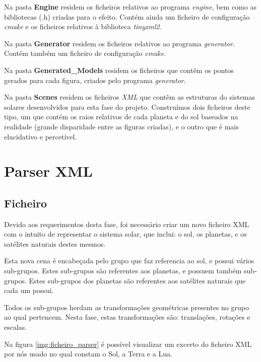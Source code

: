 \documentclass[a4paper]{article}
\begin{document}
Na pasta \textbf{Engine} residem os ficheiros relativos ao programa \emph{engine}, bem como as bibliotecas (.h) criadas para o efeito. Contém ainda um ficheiro de configuração \emph{cmake} e os ficheiros relativos à biblioteca \emph{tinyxml2}.

Na pasta \textbf{Generator} residem os ficheiros relativos ao programa \emph{generator}. Contém também um ficheiro de configuração \emph{cmake}.

Na pasta \textbf{Generated\_Models} residem os ficheiros que contêm os pontos gerados para cada figura, criados pelo programa \emph{generator}.

Na pasta \textbf{Scenes} residem os ficheiros \emph{XML} que contêm as estruturas do sistemas solares desenvolvidos para esta fase do projeto. Construímos dois ficheiros deste tipo, um que contém os raios relativos de cada planeta e do sol baseados na realidade (grande disparidade entre as figuras criadas), e o outro que é mais elucidativo e percetível.


\newpage

\section{Parser XML}
\label{sec:parser}

\subsection{Ficheiro}
\label{sec:ficheiro}

Devido aos requerimentos desta fase, foi necessário criar um novo ficheiro XML com o intuito de representar o sistema solar, que inclui: o sol, os planetas, e os satélites naturais destes mesmos.

Esta nova cena é encabeçada pelo grupo que faz referencia ao sol, e possui vários sub-grupos. Estes sub-grupos são referentes aos planetas, e possuem também sub-grupos. Estes sub-grupos dos planetas são referentes aos satélites naturais que cada um possui.

Todos os sub-grupos herdam as transformações geométricas presentes no grupo ao qual pertencem. Nesta fase, estas transformações são: translações, rotações e escalas.

Na figura \ref{img:ficheiro_parser} é possível visualizar um excerto do ficheiro XML por nós usado no qual constam o Sol, a Terra e a Lua.
\end{document}
